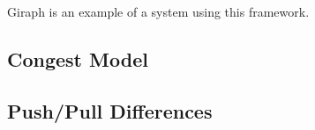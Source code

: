 Giraph \cite{Giraph} is an example of a system using this framework.

\subsection{Congest Model}



\subsection{Push/Pull Differences}

